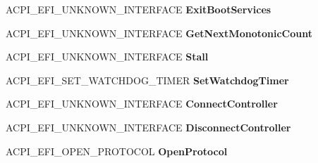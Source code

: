 \begin{DoxyCompactItemize}
\item 
\mbox{\label{struct___a_c_p_i___e_f_i___b_o_o_t___s_e_r_v_i_c_e_s_a6fe2ee3b5ffedeb01926ff716d154ddf}} 
A\+C\+P\+I\+\_\+\+E\+F\+I\+\_\+\+U\+N\+K\+N\+O\+W\+N\+\_\+\+I\+N\+T\+E\+R\+F\+A\+CE {\bfseries Exit\+Boot\+Services}
\item 
\mbox{\label{struct___a_c_p_i___e_f_i___b_o_o_t___s_e_r_v_i_c_e_s_af7ad58db14e28575d43f44ee1ea1384c}} 
A\+C\+P\+I\+\_\+\+E\+F\+I\+\_\+\+U\+N\+K\+N\+O\+W\+N\+\_\+\+I\+N\+T\+E\+R\+F\+A\+CE {\bfseries Get\+Next\+Monotonic\+Count}
\item 
\mbox{\label{struct___a_c_p_i___e_f_i___b_o_o_t___s_e_r_v_i_c_e_s_ac363c5a3f0558fec6aeba4b851b545b7}} 
A\+C\+P\+I\+\_\+\+E\+F\+I\+\_\+\+U\+N\+K\+N\+O\+W\+N\+\_\+\+I\+N\+T\+E\+R\+F\+A\+CE {\bfseries Stall}
\item 
\mbox{\label{struct___a_c_p_i___e_f_i___b_o_o_t___s_e_r_v_i_c_e_s_a8b5e99c5da3b4740a559506200f4aa4f}} 
A\+C\+P\+I\+\_\+\+E\+F\+I\+\_\+\+S\+E\+T\+\_\+\+W\+A\+T\+C\+H\+D\+O\+G\+\_\+\+T\+I\+M\+ER {\bfseries Set\+Watchdog\+Timer}
\item 
\mbox{\label{struct___a_c_p_i___e_f_i___b_o_o_t___s_e_r_v_i_c_e_s_aff2c5564e6881b7a166edbd643ed86d5}} 
A\+C\+P\+I\+\_\+\+E\+F\+I\+\_\+\+U\+N\+K\+N\+O\+W\+N\+\_\+\+I\+N\+T\+E\+R\+F\+A\+CE {\bfseries Connect\+Controller}
\item 
\mbox{\label{struct___a_c_p_i___e_f_i___b_o_o_t___s_e_r_v_i_c_e_s_aaba27bfebf9c97b0ef85db92bf944c12}} 
A\+C\+P\+I\+\_\+\+E\+F\+I\+\_\+\+U\+N\+K\+N\+O\+W\+N\+\_\+\+I\+N\+T\+E\+R\+F\+A\+CE {\bfseries Disconnect\+Controller}
\item 
\mbox{\label{struct___a_c_p_i___e_f_i___b_o_o_t___s_e_r_v_i_c_e_s_a2c63872e56c74fea0f7c5d8a14b8e77c}} 
A\+C\+P\+I\+\_\+\+E\+F\+I\+\_\+\+O\+P\+E\+N\+\_\+\+P\+R\+O\+T\+O\+C\+OL {\bfseries Open\+Protocol}
\item 
\mbox{\label{struct___a_c_p_i___e_f_i___b_o_o_t___s_e_r_v_i_c_e_s_a62f2d94fa04ec02d3996a4779358c644}} 

\end{DoxyCompactItemize}
